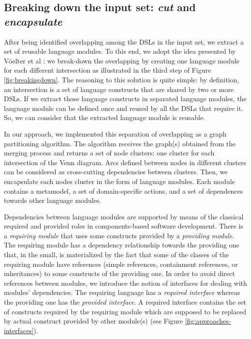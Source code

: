 \subsection{Breaking down the input set: \textit{cut} and \textit{encapsulate}}

After being identified overlapping among the DSLs in the input set, we extract a set of reusable language modules. To this end, we adopt the idea presented by V\"oelter et al \cite[p. 60-61]{voelter:2013}: we break-down the overlapping by creating one language module for each different intersection as illustrated in the third step of Figure \ref{fig:breakingdown}. The reasoning to this solution is quite simple: by definition, an intersection is a set of language constructs that are shared by two or more DSLs. If we extract those language constructs in separated language modules, the language module can be defined once and reused by all the DSLs that require it. So, we can consider that the extracted language module is reusable. 

In our approach, we implemented this separation of overlapping as a graph partitioning algorithm. The algorithm receives the graph(s) obtained from the merging process and returns a set of node clusters: one cluster for each intersection of the Venn diagram. Arcs defined between nodes in different clusters can be considered as cross-cutting dependencies between clusters. Then, we encapsulate each nodes cluster in the form of language modules. Each module contains a metamodel, a set of domain-specific actions, and a set of dependences towards other language modules. 

Dependencies between language modules are supported by means of the classical required and provided roles in components-based software development. There is a \textit{requiring module} that uses some constructs provided by a \textit{providing module}. The requiring module has a dependency relationship towards the providing one that, in the small, is materialized by the fact that some of the classes of the requiring module have references (simple references, containment references, or inheritances) to some constructs of the providing one. In order to avoid direct references between modules, we introduce the notion of interfaces for dealing with modules' dependencies. The requiring language has a \textit{required interface} whereas the providing one has the \textit{provided interface}. A required interface contains the set of constructs required by the requiring module which are supposed to be replaced by actual construct provided by other module(s) (see Figure \ref{fig:approaches-interfaces}).

